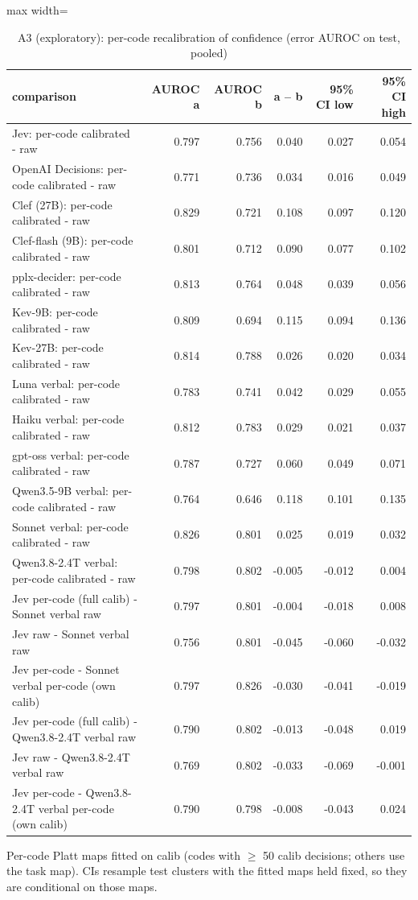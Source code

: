 \begin{table}[t]
\centering
\small
\caption{A3 (exploratory): per-code recalibration of confidence (error AUROC on test, pooled)}
\label{tab:tab10_per_code_recalibration}
\begin{adjustbox}{max width=\linewidth}
\begin{tabular}{lrrrrr}
\toprule
comparison & AUROC a & AUROC b & a -- b & 95\% CI low & 95\% CI high \\
\midrule
Jev: per-code calibrated - raw & 0.797 & 0.756 & 0.040 & 0.027 & 0.054 \\
OpenAI Decisions: per-code calibrated - raw & 0.771 & 0.736 & 0.034 & 0.016 & 0.049 \\
Clef (27B): per-code calibrated - raw & 0.829 & 0.721 & 0.108 & 0.097 & 0.120 \\
Clef-flash (9B): per-code calibrated - raw & 0.801 & 0.712 & 0.090 & 0.077 & 0.102 \\
pplx-decider: per-code calibrated - raw & 0.813 & 0.764 & 0.048 & 0.039 & 0.056 \\
Kev-9B: per-code calibrated - raw & 0.809 & 0.694 & 0.115 & 0.094 & 0.136 \\
Kev-27B: per-code calibrated - raw & 0.814 & 0.788 & 0.026 & 0.020 & 0.034 \\
Luna verbal: per-code calibrated - raw & 0.783 & 0.741 & 0.042 & 0.029 & 0.055 \\
Haiku verbal: per-code calibrated - raw & 0.812 & 0.783 & 0.029 & 0.021 & 0.037 \\
gpt-oss verbal: per-code calibrated - raw & 0.787 & 0.727 & 0.060 & 0.049 & 0.071 \\
Qwen3.5-9B verbal: per-code calibrated - raw & 0.764 & 0.646 & 0.118 & 0.101 & 0.135 \\
Sonnet verbal: per-code calibrated - raw & 0.826 & 0.801 & 0.025 & 0.019 & 0.032 \\
Qwen3.8-2.4T verbal: per-code calibrated - raw & 0.798 & 0.802 & -0.005 & -0.012 & 0.004 \\
Jev per-code (full calib) - Sonnet verbal raw & 0.797 & 0.801 & -0.004 & -0.018 & 0.008 \\
Jev raw - Sonnet verbal raw & 0.756 & 0.801 & -0.045 & -0.060 & -0.032 \\
Jev per-code - Sonnet verbal per-code (own calib) & 0.797 & 0.826 & -0.030 & -0.041 & -0.019 \\
Jev per-code (full calib) - Qwen3.8-2.4T verbal raw & 0.790 & 0.802 & -0.013 & -0.048 & 0.019 \\
Jev raw - Qwen3.8-2.4T verbal raw & 0.769 & 0.802 & -0.033 & -0.069 & -0.001 \\
Jev per-code - Qwen3.8-2.4T verbal per-code (own calib) & 0.790 & 0.798 & -0.008 & -0.043 & 0.024 \\
\bottomrule
\end{tabular}
\end{adjustbox}
\par\smallskip\footnotesize\raggedright Per-code Platt maps fitted on calib (codes with $\geq$ 50 calib decisions; others use the task map). CIs resample test clusters with the fitted maps held fixed, so they are conditional on those maps.
\end{table}
